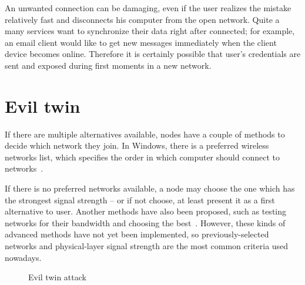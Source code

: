 \documentclass[12pt,a4paper,oneside,pdftex]{report}
\begin{document}
An unwanted connection can be damaging, even if the user realizes the mistake relatively fast and disconnects his computer from the open network. Quite a many services want to synchronize their data right after connected; for example, an email client would like to get new messages immediately when the client device becomes online. Therefore it is certainly possible that user's credentials are sent and exposed during first moments in a new network.

\section{Evil twin}
\label{sec:evil_twin}

If there are multiple alternatives available, nodes have a couple of methods to decide which network they join. In Windows, there is a preferred wireless networks list, which specifies the order in which computer should connect to networks~\cite{windows_wifi_preferred}. 

If there is no preferred networks available, a node may choose the one which has the strongest signal strength -- or if not choose, at least present it as a first alternative to user. Another methods have also been proposed, such as testing networks for their bandwidth and choosing the best~\cite{Nicholson:2006:APselection}. However, these kinds of advanced methods have not yet been implemented, so previously-selected networks and physical-layer signal strength are the most common criteria used nowadays.

\begin{figure}
    \begin{center}
    \caption{Evil twin attack}
    \label{fig:evil_twin}
    \end{center}
\end{figure}
\end{document}
